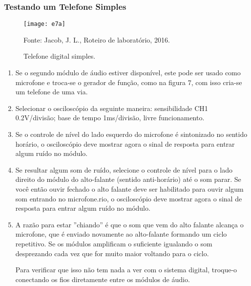             \subsubsection{Testando um Telefone Simples}
                \begin{figure}[H]
                    \centering
                    \caption{Telefone digital simples.}
                    \texttt{[image: e7a]}
                    
                    \small Fonte: Jacob, J. L., Roteiro de laboratório, 2016.
                    \label{fig:e7a}
                \end{figure}
                
                \begin{enumerate}
                    \item Se o segundo módulo de áudio estiver disponível, este pode ser usado como microfone e troca-se o gerador de função, como na figura 7, com isso cria-se um telefone de uma via.
                    
                    \item Selecionar o osciloscópio da seguinte maneira: sensibilidade CH1 0.2V/divisão; base de tempo 1ms/divisão, livre funcionamento.
                    
                    \item Se o controle de nível do lado esquerdo do microfone é sintonizado no sentido horário, o osciloscópio deve mostrar agora o sinal de resposta para entrar algum ruído no módulo.
                    
                    \item Se resultar algum som de ruído, selecione o controle de nível para o lado direito do módulo do alto-falante (sentido anti-horário) até o som parar. Se você então ouvir fechado o alto falante deve ser habilitado para ouvir algum som entrando no microfone.rio, o osciloscópio deve mostrar agora o sinal de resposta para entrar algum ruído no módulo.
                    
                    \item A razão para estar ”chiando” é que o som que vem do alto falante alcança o microfone, que é
                    enviado novamente ao alto-falante formando um ciclo repetitivo. Se os módulos amplificam o suficiente igualando o som desprezando cada vez que for muito maior voltando para o ciclo. 
                    
                    Para verificar que isso não tem nada a ver com o sistema digital, troque-o conectando os fios diretamente entre os módulos de áudio.
                \end{enumerate}
                
